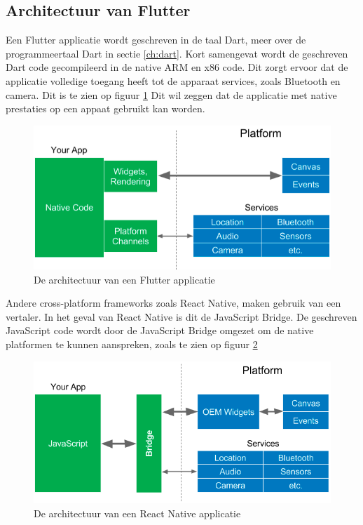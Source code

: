 \subsection{Architectuur van Flutter}
Een Flutter applicatie wordt geschreven in de taal Dart, meer over de programmeertaal Dart in sectie \ref{ch:dart}. Kort samengevat wordt de geschreven Dart code gecompileerd in de native ARM en x86 code. 
Dit zorgt ervoor dat de applicatie volledige toegang heeft tot de apparaat services, zoals Bluetooth en camera. Dit is te zien op figuur \ref{fig:flutter-app-architecture}
Dit wil zeggen dat de applicatie met native prestaties op een appaat gebruikt kan worden.

\begin{figure}[H]
    \centering
    \includegraphics[width=\figureWidthModifier\linewidth]{img/stand-van-zaken/flutter-app-architecture.png}
    \caption{De architectuur van een Flutter applicatie \autocite{Leler2017}}
    \label{fig:flutter-app-architecture}
\end{figure}

Andere cross-platform frameworks zoals React Native, maken gebruik van een vertaler. In het geval van React Native is dit de JavaScript Bridge. De geschreven JavaScript code wordt door de JavaScript Bridge omgezet om de native platformen te kunnen aanspreken, zoals te zien op figuur \ref{fig:react-native-app-architecture}  \autocite{Kuitunen2019}

\begin{figure}[H]
    \centering
    \includegraphics[width=\figureWidthModifier\linewidth]{img/stand-van-zaken/react-native-app-architecture.png}
    \caption{De architectuur van een React Native applicatie \autocite{Leler2017}}
    \label{fig:react-native-app-architecture}
\end{figure}

